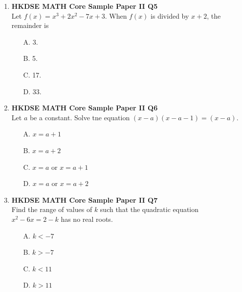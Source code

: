 \documentclass[12pt]{article}
\begin{document}
\begin{enumerate}
	\item \textbf{HKDSE MATH Core Sample Paper II Q5}\\
	Let $f(x) = x^3 + 2x^2 - 7x + 3$. When $f(x)$ is divided by $x + 2$, the remainder is 
	\begin{enumerate}
		\item[A.] 3.
		\item[B.] 5.
		\item[C.] 17.
		\item[D.] 33.
	\end{enumerate}

	\item \textbf{HKDSE MATH Core Sample Paper II Q6}\\
	Let $a$ be a constant. Solve tne equation $(x - a)(x - a - 1) = (x - a)$.
	\begin{enumerate}
		\item[A.] $x = a + 1$
		\item[B.] $x = a + 2$
		\item[C.] $x = a$ or $x = a + 1$
		\item[D.] $x = a$ or $x = a + 2$
	\end{enumerate}

	\item \textbf{HKDSE MATH Core Sample Paper II Q7}\\
	Find the range of values of $k$ such that the quadratic equation $x^2 - 6x = 2 - k$ has no real roots.
	\begin{enumerate}
		\item[A.] $k < -7$
		\item[B.] $k > -7$
		\item[C.] $k < 11$
		\item[D.] $k > 11$
	\end{enumerate}
	

\end{enumerate}
\end{document}
